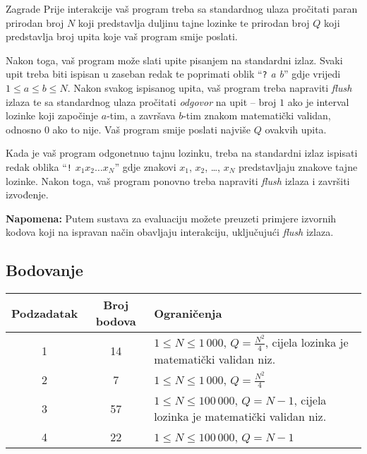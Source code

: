 \begin{statement}[
  problempoints=100,
  timelimit=1 sekunda,
  memorylimit=512 MiB,
]{Zagrade}
Prije interakcije vaš program treba sa standardnog ulaza pročitati paran
prirodan broj $N$ koji predstavlja duljinu tajne lozinke te prirodan broj $Q$
koji predstavlja broj upita koje vaš program smije poslati.

Nakon toga, vaš program može slati upite pisanjem na standardni izlaz. Svaki
upit treba biti ispisan u zaseban redak te poprimati oblik
``\texttt{?} \textit{a b}''
gdje vrijedi $1 \le a \le b \le N$. Nakon svakog ispisanog upita, vaš program
treba napraviti \textit{flush} izlaza te sa standardnog ulaza pročitati
\textit{odgovor} na upit -- broj $1$ ako je interval lozinke koji započinje
$a$-tim, a završava $b$-tim znakom matematički validan, odnosno $0$ ako to
nije. Vaš program smije poslati najviše $Q$ ovakvih upita.

Kada je vaš program odgonetnuo tajnu lozinku, treba na standardni izlaz
ispisati redak oblika ``\texttt{!} \textit{$x_1x_2\dots x_N$}'' gdje znakovi
$x_1$, $x_2$, \dots, $x_N$ predstavljaju znakove tajne lozinke. Nakon toga, vaš
program ponovno treba napraviti \textit{flush} izlaza i završiti izvođenje.

\textbf{Napomena:} Putem sustava za evaluaciju možete preuzeti primjere
izvornih kodova koji na ispravan način obavljaju interakciju, uključujući
\textit{flush} izlaza.

\subsection*{Bodovanje}
{\renewcommand{\arraystretch}{1.4}
  \setlength{\tabcolsep}{6pt}
  \begin{tabular}{ccl}
    Podzadatak & Broj bodova & Ograničenja \\ \midrule
    1 & 14 & $1 \le N \le 1\,000$, $Q = \frac{N^2}{4}$, cijela lozinka je matematički validan niz. \\
    2 & 7 & $1 \le N \le 1\,000$, $Q = \frac{N^2}{4}$ \\
    3 & 57 & $1 \le N \le 100\,000 $, $Q = N - 1$, cijela lozinka je matematički validan niz. \\
    4 & 22 & $1 \le N \le 100\,000 $, $Q = N - 1$ \\
\end{tabular}}


\end{statement}
